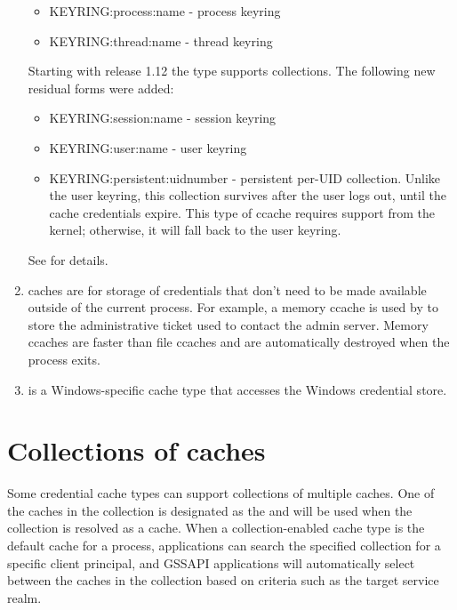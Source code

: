 \documentclass[letterpaper,10pt,english]{sphinxmanual}
\begin{document}
\begin{enumerate}
\begin{itemize}
\item {} 
KEYRING:process:name - process keyring

\item {} 
KEYRING:thread:name -  thread keyring

\end{itemize}

Starting with release 1.12 the  type supports collections.
The following new residual forms were added:
\begin{itemize}
\item {} 
KEYRING:session:name - session keyring

\item {} 
KEYRING:user:name - user keyring

\item {} 
KEYRING:persistent:uidnumber - persistent per-UID collection.
Unlike the user keyring, this collection survives after the user
logs out, until the cache credentials expire.  This type of
ccache requires support from the kernel; otherwise, it will fall
back to the user keyring.

\end{itemize}

See {\hyperref[\detokenize{basic/ccache_def:col-ccache}]{}} for details.

\item {} 
 caches are for storage of credentials that don’t need to
be made available outside of the current process.  For example, a
memory ccache is used by  to store the
administrative ticket used to contact the admin server.  Memory
ccaches are faster than file ccaches and are automatically
destroyed when the process exits.

\item {} 
 is a Windows-specific cache type that accesses the
Windows credential store.

\end{enumerate}


\section{Collections of caches}
\label{\detokenize{basic/ccache_def:collections-of-caches}}\label{\detokenize{basic/ccache_def:col-ccache}}
Some credential cache types can support collections of multiple
caches.  One of the caches in the collection is designated as the
 and will be used when the collection is resolved as a cache.
When a collection-enabled cache type is the default cache for a
process, applications can search the specified collection for a
specific client principal, and GSSAPI applications will automatically
select between the caches in the collection based on criteria such as
the target service realm.
\end{document}
